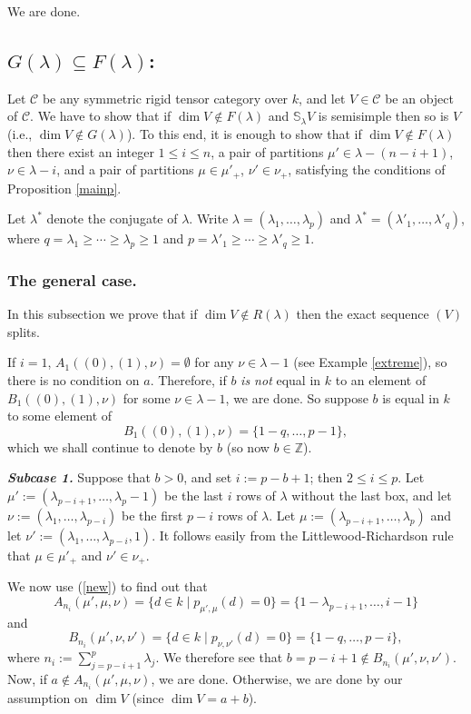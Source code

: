 \documentclass{amsart}
\theoremstyle{definition}
\newcommand{\C}{{\mathcal C}}
\begin{document}
We are done.

\subsection{$G(\lambda)\subseteq F(\lambda)$:} Let $\C$ be any symmetric rigid
tensor category over $k$, and let $V\in\C$ be an object of $\C$. We
have to show that if $\dim V\notin F(\lambda)$ and
$\mathbb{S}_{\lambda}V$ is semisimple then so is $V$ (i.e., $\dim
V\notin G(\lambda)$). To this end, it is enough to show that if
$\dim V\notin F(\lambda)$ then there exist an integer $1\le i\le n$,
a pair of partitions $\mu'\in \lambda-(n-i+1)$, $\nu\in \lambda-i$,
and a pair of partitions $\mu\in \mu'_+$, $\nu'\in \nu_+$,
satisfying the conditions of Proposition \ref{mainp}.

Let $\lambda^*$ denote the conjugate of $\lambda$. Write
$\lambda=(\lambda_1,\dots,\lambda_p)$ and
$\lambda^*=(\lambda'_1,\dots,\lambda'_q)$, where $q=\lambda_1
\ge\cdots\ge\lambda_p\ge 1$ and $p=\lambda'_1
\ge\cdots\ge\lambda'_q\ge 1$.

\subsubsection{\textbf{The general case.}} In this subsection we prove that if
$\dim V\notin R(\lambda)$ then the exact sequence $(V)$ splits.

If $i=1$, $A_1((0),(1),\nu)=\emptyset$ for any $\nu\in \lambda-1$
(see Example \ref{extreme}), so there is no condition on $a$.
Therefore, if $b$ {\em is not} equal in $k$ to an element of
$B_1((0),(1),\nu)$ for some $\nu\in \lambda-1$, we are done. So
suppose $b$ is equal in $k$ to some element of
$$B_1((0),(1),\nu)=\{1-q,\dots,p-1\},$$ which we shall continue to
denote by $b$ (so now $b\in \mathbb{Z}$).

\textbf{\emph{Subcase 1.}} Suppose that $b>0$, and set $i:=p-b+1$;
then $2\le i \le p$. Let $\mu':=(\lambda_{p-i+1},\dots,\lambda_p-1)$
be the last $i$ rows of $\lambda$ without the last box, and let
$\nu:=(\lambda_{1},\dots,\lambda_{p-i})$ be the first $p-i$ rows of
$\lambda$. Let $\mu:=(\lambda_{p-i+1},\dots,\lambda_p)$ and let
$\nu':=(\lambda_{1},\dots,\lambda_{p-i},1)$. It follows easily from
the Littlewood-Richardson rule that $\mu\in\mu'_+$ and
$\nu'\in\nu_+$.

We now use (\ref{new}) to find out that
\begin{equation}\label{a1}
A_{n_i}(\mu',\mu,\nu)= \{d\in k\mid p_{\mu',\mu}(d)=0\}=
\{1-\lambda_{p-i+1},\dots,i-1\}
\end{equation}
and
\begin{equation}\label{b1}
B_{n_i}(\mu',\nu,\nu')= \{d\in k\mid p_{\nu,\nu'}(d)=0\}=
\{1-q,\dots,p-i\},
\end{equation}
where $n_i:=\sum_{j=p-i+1}^p \lambda_j$. We therefore see that
$b=p-i+1\notin B_{n_i}(\mu',\nu,\nu')$. Now, if $a\notin
A_{n_i}(\mu',\mu,\nu)$, we are done. Otherwise, we are done by our
assumption on $\dim V$ (since $\dim V=a+b$).
\end{document}
